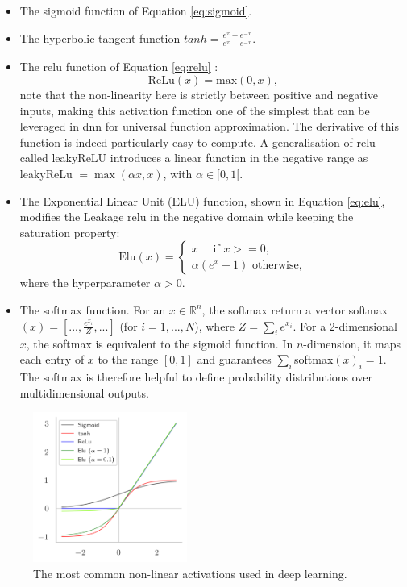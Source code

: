\begin{itemize}
    \item The sigmoid function of Equation \ref{eq:sigmoid}.
    \item The hyperbolic tangent function $tanh = \frac{e^x - e^{-x}}{e^x + e^{-x}}$.
    \item The \gls{relu} function of Equation \ref{eq:relu} \cite{agarap2019deep}:
    \begin{equation}\label{eq:relu}
        \text{ReLu}(x) = \text{max}(0, x),
    \end{equation}
    note that the non-linearity here is strictly between positive and negative inputs, making this activation function one of the simplest that can be leveraged in \gls{dnn} for universal function approximation. The derivative of this function is indeed particularly easy to compute. A generalisation of \gls{relu} called leakyReLU introduces a linear function in the negative range as leakyReLu $= \max(\alpha x, x)$, with $\alpha \in [0, 1[$. 
    \item The Exponential Linear Unit (ELU) function, shown in Equation \ref{eq:elu}, modifies the Leakage \gls{relu} in the negative domain while keeping the saturation property:
    \begin{equation}\label{eq:elu}
        \text{Elu}(x) = 
        \begin{cases}
            x \quad \text{ if } x >= 0, \\
            \alpha (e^x - 1) \text{ otherwise},
        \end{cases}
    \end{equation}
    where the hyperparameter $\alpha > 0$.
    \item The softmax function. For an $x \in \mathbb{R}^n$, the softmax return a vector softmax$(x) = [..., \frac{e^{x_i}}{Z}, ...]$ (for $i= 1, ..., N$), where $Z = \sum_i e^{x_i}$. For a 2-dimensional $x$, the softmax is equivalent to the sigmoid function. In $n$-dimension, it maps each entry of $x$ to the range $[0, 1]$ and guarantees $\sum_i $softmax$(x)_i = 1$. The softmax is therefore  helpful to define probability distributions over multidimensional outputs.
\end{itemize}

\begin{figure}
    \begin{center}
        \includegraphics[width=0.45\textwidth]{Images/ML/activations.png}
        \caption{The most common non-linear activations used in deep learning.} 
        \label{fig:commonAct}
    \end{center}
\end{figure}

